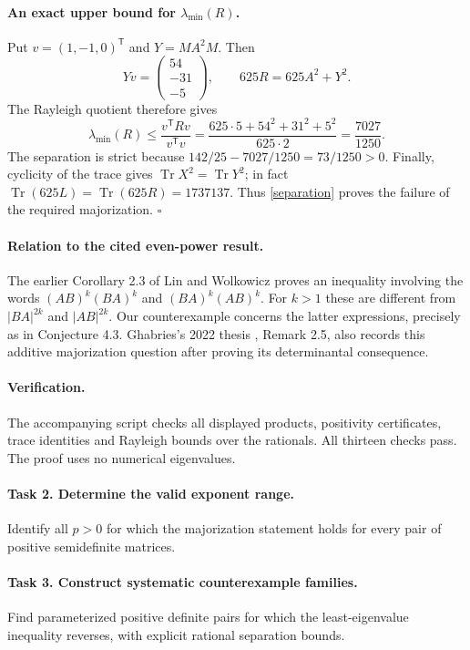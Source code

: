 \documentclass[11pt]{article}
\newcommand{\Tr}{\operatorname{Tr}}
\newcommand{\lmin}{\lambda_{\min}}
\begin{document}
\paragraph{An exact upper bound for \(\lmin(R)\).}
Put $v=(1,-1,0)^{\mathsf T}$ and $Y=MA^2M$. Then
\[
 Yv=\begin{pmatrix}54\\-31\\-5\end{pmatrix},\qquad
 625R=625A^2+Y^2.
\]
The Rayleigh quotient therefore gives
\[
 \lmin(R)\leq
 \frac{v^{\mathsf T}Rv}{v^{\mathsf T}v}
 =\frac{625\cdot5+54^2+31^2+5^2}{625\cdot2}
 =\frac{7027}{1250}.
\]
The separation is strict because
$142/25-7027/1250=73/1250>0$.
Finally, cyclicity of the trace gives $\Tr X^2=\Tr Y^2$;
in fact $\Tr(625L)=\Tr(625R)=1737137$.
Thus \eqref{separation} proves the failure of the required majorization.
\hfill$\square$

\paragraph{Relation to the cited even-power result.}
The earlier Corollary 2.3 of Lin and Wolkowicz proves an inequality
involving the words
$(AB)^k(BA)^k$ and $(BA)^k(AB)^k$.
For $k>1$ these are different from $|BA|^{2k}$ and $|AB|^{2k}$.
Our counterexample concerns the latter expressions, precisely as in
Conjecture 4.3. Ghabries's 2022 thesis \cite{G}, Remark 2.5, also records this
additive majorization question after proving its determinantal consequence.

\paragraph{Verification.}
The accompanying script checks all displayed products, positivity
certificates, trace identities and Rayleigh bounds over the rationals.
All thirteen checks pass. The proof uses no numerical eigenvalues.

\paragraph{Task 2. Determine the valid exponent range.}
Identify all $p>0$ for which the majorization statement holds for every
pair of positive semidefinite matrices.

\paragraph{Task 3. Construct systematic counterexample families.}
Find parameterized positive definite pairs for which the least-eigenvalue
inequality reverses, with explicit rational separation bounds.
\end{document}
